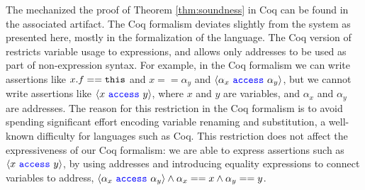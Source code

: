 
The mechanized  the proof of Theorem \ref{thm:soundness} in Coq 
can be found in the associated artifact. 
The   Coq formalism deviates slightly from the system as
presented here,  mostly in the formalization of the 
\SpecO language. The Coq version of \SpecO restricts variable usage to expressions, and allows only addresses to 
be used as part of non-expression syntax. 
For example, in the Coq formalism
we can write assertions like $x.f=={\texttt{this}}$ and
$x==\alpha_y$ and  $\langle \alpha_x\ {\color{blue}\texttt{access}}\ \alpha_y \rangle$, but we cannot write assertions 
like $\langle x\ {\color{blue}\texttt{access}}\ y \rangle$, where $x$ and $y$ are variables, and $\alpha_x$ and $\alpha_y$ are
addresses.
The reason for this restriction in the Coq formalism is to avoid spending %
significant effort encoding variable
renaming and substitution, a well-known difficulty for languages such as Coq. 
This restriction does not affect the expressiveness of %
our  Coq formalism: we are
able to express assertions such as $\langle x\ {\color{blue}\texttt{access}}\ y \rangle$, by using addresses and introducing equality expressions %
to connect variables to address, \ie
 $\langle \alpha_x\ {\color{blue}\texttt{access}}\ \alpha_y \rangle \wedge \alpha_x == x \wedge \alpha_y == y$.



